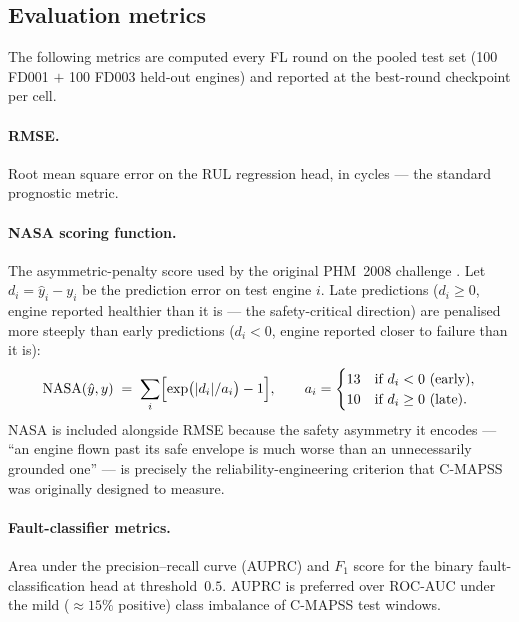 \documentclass[a4paper,fleqn,doubleblind]{cas-sc}
\begin{document}
\subsection{Evaluation metrics}
\label{subsec:metrics}

The following metrics are computed every FL round on the pooled
test set (100 FD001 $+$ 100 FD003 held-out engines) and reported at
the best-round checkpoint per cell.

\paragraph{RMSE.}
Root mean square error on the RUL regression head, in cycles ---
the standard prognostic metric.

\paragraph{NASA scoring function.}
The asymmetric-penalty score used by the original PHM~2008
challenge \citep{Saxena2008CMAPSS}. Let
$d_i = \hat{y}_i - y_i$ be the prediction error on test engine
$i$. Late predictions ($d_i \geq 0$, engine reported healthier than
it is --- the safety-critical direction) are penalised more
steeply than early predictions ($d_i < 0$, engine reported closer
to failure than it is):
\begin{equation}
    \mathrm{NASA}(\hat{y}, y)
    \;=\; \sum_{i} \Bigl[ \exp\bigl(|d_i| / a_i\bigr) - 1 \Bigr],
    \qquad
    a_i =
    \begin{cases}
        13 & \text{if } d_i < 0 \ (\text{early}), \\
        10 & \text{if } d_i \geq 0 \ (\text{late}).
    \end{cases}
    \label{eq:nasa}
\end{equation}
NASA is included alongside RMSE because the safety asymmetry it
encodes --- ``an engine flown past its safe envelope is much worse
than an unnecessarily grounded one'' --- is precisely the
reliability-engineering criterion that C-MAPSS was originally
designed to measure.

\paragraph{Fault-classifier metrics.}
Area under the precision--recall curve (AUPRC) and $F_1$ score for
the binary fault-classification head at threshold~$0.5$. AUPRC is
preferred over ROC-AUC under the mild ($\approx 15\%$ positive) class
imbalance of C-MAPSS test windows.
\end{document}
